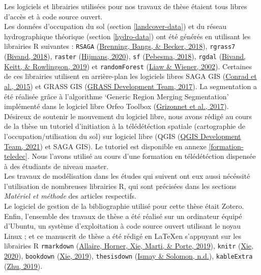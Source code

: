 \documentclass[12pt,twoside]{reedthesis}
\begin{document}
Les logiciels et librairies utilisées pour nos travaux de thèse étaient tous libres d'accès et à code source ouvert.\\

Les données d'occupation du sol (section \ref{landcover-data}) et du réseau hydrographique théorique (section \ref{hydro-data}) ont été générés en utilisant les librairies R suivantes : \texttt{RSAGA} (\protect\hyperlink{ref-brenning_rsaga_2018}{Brenning, Bangs, \& Becker, 2018}), \texttt{rgrass7} (\protect\hyperlink{ref-bivand_rgrass7_2018}{Bivand, 2018}), \texttt{raster} (\protect\hyperlink{ref-hijmans_raster_2020}{Hijmans, 2020}), \texttt{sf} (\protect\hyperlink{ref-pebesma_simple_2018}{Pebesma, 2018}), \texttt{rgdal} (\protect\hyperlink{ref-bivand_rgdal_2019}{Bivand, Keitt, \& Rowlingson, 2019}) et \texttt{randomForest} (\protect\hyperlink{ref-liaw_classification_2002}{Liaw \& Wiener, 2002}). Certaines de ces librairies utilisent en arrière-plan les logiciels libres SAGA GIS (\protect\hyperlink{ref-conrad_system_2015}{Conrad et al., 2015}) et GRASS GIS (\protect\hyperlink{ref-GRASS_GIS_software}{GRASS Development Team, 2017}). La segmentation a été réalisée grâce à l'algorithme `Generic Region Merging Segmentation' implémenté dans le logiciel libre Orfeo Toolbox (\protect\hyperlink{ref-grizonnet2017orfeo}{Grizonnet et al., 2017}).\\

Désireux de soutenir le mouvement du logiciel libre, nous avons rédigé au cours de la thèse un tutoriel d'initiation à la télédétéction spatiale (cartographie de l'occupation/utilisation du sol) sur logiciel libre (QGIS (\protect\hyperlink{ref-qgis_development_team_qgis_2021}{QGIS Development Team, 2021}) et SAGA GIS). Le tutoriel est disponible en annexe \ref{formation-teledec}. Nous l'avons utilisé au cours d'une formation en télédétéction dispensée à des étudiants de niveau master.\\

Les travaux de modélisation dans les études qui suivent ont eux aussi nécéssité l'utilisation de nombreuses librairies R, qui sont précisées dans les sections \emph{Matériel et méthode} des articles respectifs.\\

Le logiciel de gestion de la bibliographie utilisé pour cette thèse était Zotero. Enfin, l'ensemble des travaux de thèse a été réalisé sur un ordinateur équipé d'Ubuntu, un système d'exploitation à code source ouvert utilisant le noyau Linux ; et ce manuscrit de thèse a été rédigé en \LaTeX  en s'appuyant sur les librairies R \texttt{rmarkdown} (\protect\hyperlink{ref-markdown}{Allaire, Horner, Xie, Marti, \& Porte, 2019}), \texttt{knitr} (\protect\hyperlink{ref-knitr}{Xie, 2020}), \texttt{bookdown} (\protect\hyperlink{ref-bookdown}{Xie, 2019}), \texttt{thesisdown} (\protect\hyperlink{ref-thesisdown}{Ismay \& Solomon, n.d.}), \texttt{kableExtra} (\protect\hyperlink{ref-kableExtra}{Zhu, 2019}).
\end{document}
